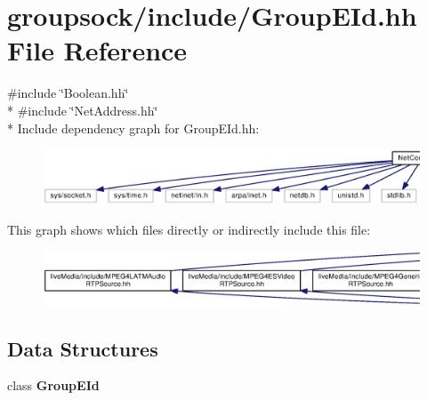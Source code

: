 \section{groupsock/include/\+Group\+E\+Id.hh File Reference}
\label{GroupEId_8hh}
{\ttfamily \#include \char`\"{}Boolean.\+hh\char`\"{}}\\*
{\ttfamily \#include \char`\"{}Net\+Address.\+hh\char`\"{}}\\*
Include dependency graph for Group\+E\+Id.\+hh\+:
\nopagebreak
\begin{figure}[H]
\begin{center}
\leavevmode
\includegraphics[width=350pt]{GroupEId_8hh__incl}
\end{center}
\end{figure}
This graph shows which files directly or indirectly include this file\+:
\nopagebreak
\begin{figure}[H]
\begin{center}
\leavevmode
\includegraphics[width=350pt]{GroupEId_8hh__dep__incl}
\end{center}
\end{figure}
\subsection*{Data Structures}
\begin{DoxyCompactItemize}
\item 
class {\bf Group\+E\+Id}
\end{DoxyCompactItemize}

